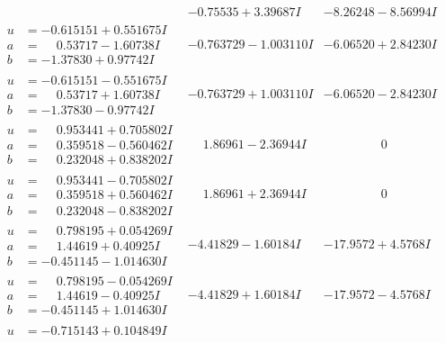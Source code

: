 \documentclass[1p]{elsarticle_modified}
\theoremstyle{definition}
\begin{document}
$$\begin{array}{c|c|c}
 & -0.75535 + 3.39687 I & -8.26248 - 8.56994 I \\ \hline\begin{aligned}
u &= -0.615151 + 0.551675 I \\
a &= \phantom{-}0.53717 - 1.60738 I \\
b &= -1.37830 + 0.97742 I\end{aligned}
 & -0.763729 - 1.003110 I & -6.06520 + 2.84230 I \\ \hline\begin{aligned}
u &= -0.615151 - 0.551675 I \\
a &= \phantom{-}0.53717 + 1.60738 I \\
b &= -1.37830 - 0.97742 I\end{aligned}
 & -0.763729 + 1.003110 I & -6.06520 - 2.84230 I \\ \hline\begin{aligned}
u &= \phantom{-}0.953441 + 0.705802 I \\
a &= \phantom{-}0.359518 - 0.560462 I \\
b &= \phantom{-}0.232048 + 0.838202 I\end{aligned}
 & \phantom{-}1.86961 - 2.36944 I & \phantom{-0.000000 } 0 \\ \hline\begin{aligned}
u &= \phantom{-}0.953441 - 0.705802 I \\
a &= \phantom{-}0.359518 + 0.560462 I \\
b &= \phantom{-}0.232048 - 0.838202 I\end{aligned}
 & \phantom{-}1.86961 + 2.36944 I & \phantom{-0.000000 } 0 \\ \hline\begin{aligned}
u &= \phantom{-}0.798195 + 0.054269 I \\
a &= \phantom{-}1.44619 + 0.40925 I \\
b &= -0.451145 - 1.014630 I\end{aligned}
 & -4.41829 - 1.60184 I & -17.9572 + 4.5768 I \\ \hline\begin{aligned}
u &= \phantom{-}0.798195 - 0.054269 I \\
a &= \phantom{-}1.44619 - 0.40925 I \\
b &= -0.451145 + 1.014630 I\end{aligned}
 & -4.41829 + 1.60184 I & -17.9572 - 4.5768 I \\ \hline\begin{aligned}
u &= -0.715143 + 0.104849 I \\

\end{aligned}
\end{array}$$
\end{document}
